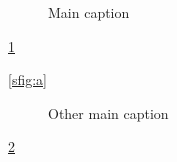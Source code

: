\documentclass{scrartcl}
\begin{document}
  \begin{figure}[h]%
    \caption{Main caption\label{fig:1}}%
  \end{figure}

  \cref{fig:1}

  \cref{sfig:a}

  \begin{figure}[h]%
    \caption{Other main caption\label{fig:2}}%
  \end{figure}

  \cref{fig:2}
\end{document}
